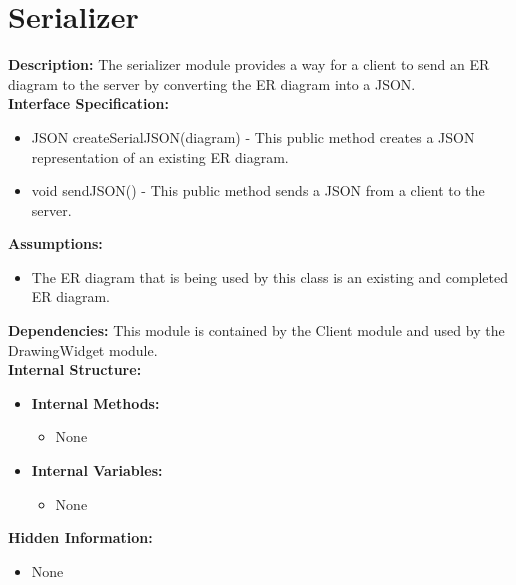 \chapter{Serializer}
\textbf{Description:} The serializer module provides a way for a client to send an ER diagram to the server by converting the ER diagram into a JSON. \\
\textbf{Interface Specification:}
\begin{itemize}
\item{JSON createSerialJSON(diagram) - This public method creates a JSON representation of an existing ER diagram.}
\item{void sendJSON() - This public method sends a JSON from a client to the server.}
\end{itemize}
\textbf{Assumptions:}
\begin{itemize}
\item{The ER diagram that is being used by this class is an existing and completed ER diagram.}
\end{itemize}
\textbf{Dependencies:}
This module is contained by the Client module and used by the DrawingWidget module. \\
\textbf{Internal Structure:}
\begin{itemize}
        	\item{\textbf{Internal Methods:} 
        	\begin{itemize}
        	\item{None}
        	\end{itemize}}
        	\item{\textbf{Internal Variables:} 
        	\begin{itemize}
        	\item{None}
        	\end{itemize}}
\end{itemize}
\textbf{Hidden Information:}
\begin{itemize}
\item{None}
\end{itemize}
 

